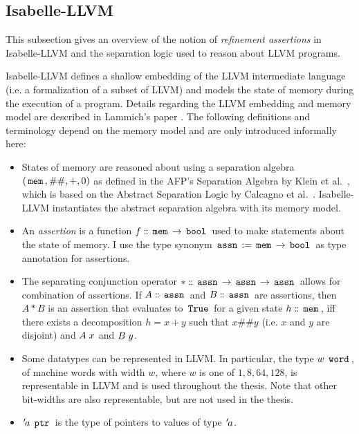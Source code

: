 \subsection{Isabelle-LLVM}\label{sec:isabelle-llvm}

This subsection gives an overview of the notion of \textit{refinement assertions} in Isabelle-LLVM and the separation logic used to reason about LLVM programs.

Isabelle-LLVM defines a shallow embedding of the LLVM intermediate language (i.e. a formalization of a subset of LLVM) and models the state of memory during the execution of a program.
Details regarding the LLVM embedding and memory model are described in Lammich's paper \cite{isabelle-llvm}.
The following definitions and terminology depend on the memory model and are only introduced informally here:
\begin{itemize}
	\item States of memory are reasoned about using a separation algebra $(\,\text{\ttfamily mem}\,, \#\#, +, 0)$ as defined in the AFP's Separation Algebra by Klein et al.~\cite{Separation_Algebra-AFP}, which is based on the Abstract Separation Logic by Calcagno et al.~\cite{Abstract_Separation_Logic}.
	      Isabelle-LLVM instantiates the abstract separation algebra with its memory model.
	\item An \textit{assertion} is a function $f \mathrel{\mathord{:}\mkern-1.2mu\mathord{:}} \,\text{\ttfamily mem}\, \rightarrow \,\text{\ttfamily bool}\,$ used to make statements about the state of memory.
	      I use the type synonym $\,\text{\ttfamily assn}\, := \,\text{\ttfamily mem}\, \rightarrow \,\text{\ttfamily bool}\,$ as type annotation for assertions.
	\item The separating conjunction operator $\ast \mathrel{\mathord{:}\mkern-1.2mu\mathord{:}} \,\text{\ttfamily assn}\, \rightarrow \,\text{\ttfamily assn}\, \rightarrow \,\text{\ttfamily assn}\,$ allows for combination of assertions.
	      If $A \mathrel{\mathord{:}\mkern-1.2mu\mathord{:}} \,\text{\ttfamily assn}\,$ and $B \mathrel{\mathord{:}\mkern-1.2mu\mathord{:}} \,\text{\ttfamily assn}\,$ are assertions, then $A \ast B$ is an assertion that evaluates to $\,\text{\ttfamily True}\,$ for a given state $h \mathrel{\mathord{:}\mkern-1.2mu\mathord{:}} \,\text{\ttfamily mem}\,$, iff there exists a decomposition $h = x + y$ such that $x \#\# y$ (i.e. $x$ and $y$ are disjoint) and $A \; x$ and $B \; y$.
	\item Some datatypes can be represented in LLVM.
	      In particular, the type $w \; \,\text{\ttfamily word}\,$, of machine words with width $w$, where $w$ is one of $1,8,64,128$, is representable in LLVM and is used throughout the thesis.
	      Note that other bit-widths are also representable, but are not used in the thesis.
	\item ${\mskip2mu '\mskip-2mua} \; \,\text{\ttfamily ptr}\,$ is the type of pointers to values of type ${\mskip2mu '\mskip-2mua}$.

\end{itemize}
